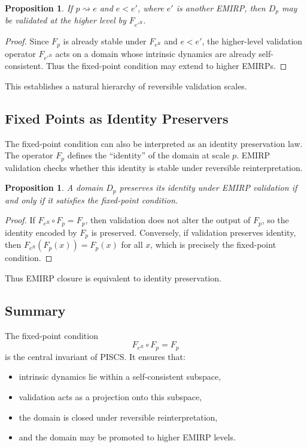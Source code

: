 \documentclass[11pt]{article}
\theoremstyle{definition}
\theoremstyle{plain}
\newtheorem{proposition}[definition]{Proposition}
\theoremstyle{remark}
\begin{document}
\begin{proposition}
If $p \rightsquigarrow e$ and $e < e'$, where $e'$ is another EMIRP,
then $D_p$ may be validated at the higher level by $F_{e'^R}$.
\end{proposition}

\begin{proof}
Since $F_p$ is already stable under $F_{e^R}$ and $e < e'$, the
higher-level validation operator $F_{e'^R}$ acts on a domain whose
intrinsic dynamics are already self-consistent. Thus the fixed-point
condition may extend to higher EMIRPs.
\end{proof}

This establishes a natural hierarchy of reversible validation scales.

\subsection{Fixed Points as Identity Preservers}

The fixed-point condition can also be interpreted as an identity
preservation law. The operator $F_p$ defines the ``identity'' of the
domain at scale $p$. EMIRP validation checks whether this identity is
stable under reversible reinterpretation.

\begin{proposition}
A domain $D_p$ preserves its identity under EMIRP validation if and only
if it satisfies the fixed-point condition.
\end{proposition}

\begin{proof}
If $F_{e^R} \circ F_p = F_p$, then validation does not alter the output
of $F_p$, so the identity encoded by $F_p$ is preserved. Conversely, if
validation preserves identity, then $F_{e^R}(F_p(x)) = F_p(x)$ for all
$x$, which is precisely the fixed-point condition.
\end{proof}

Thus EMIRP closure is equivalent to identity preservation.

\subsection{Summary}

The fixed-point condition
\[
F_{e^R} \circ F_p = F_p
\]
is the central invariant of PISCS. It ensures that:

\begin{itemize}
    \item intrinsic dynamics lie within a self-consistent subspace,
    \item validation acts as a projection onto this subspace,
    \item the domain is closed under reversible reinterpretation,
    \item and the domain may be promoted to higher EMIRP levels.
\end{itemize}
\end{document}
